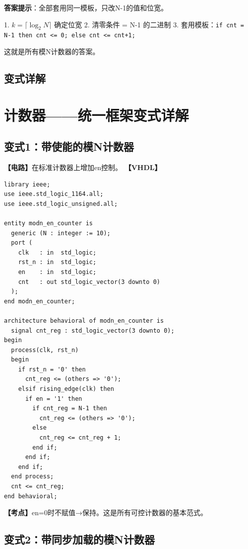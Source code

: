 \textbf{答案提示}：全部套用同一模板，只改N-1的值和位宽。

\begin{examtip}[模N计数器秒杀法]
1. $k = \lceil \log_2 N \rceil$ 确定位宽
2. 清零条件 = N-1 的二进制
3. 套用模板：\texttt{if cnt = N-1 then cnt <= 0; else cnt <= cnt+1;}

这就是所有模N计数器的答案。
\end{examtip}

\section{变式详解}
\chapter{计数器——统一框架变式详解}

\section{变式1：带使能的模N计数器}

\begin{detailbox}[完整教学]
\textbf{【电路】}在标准计数器上增加en控制。
\textbf{【VHDL】}
\begin{lstlisting}
library ieee;
use ieee.std_logic_1164.all;
use ieee.std_logic_unsigned.all;

entity modn_en_counter is
  generic (N : integer := 10);
  port (
    clk   : in  std_logic;
    rst_n : in  std_logic;
    en    : in  std_logic;
    cnt   : out std_logic_vector(3 downto 0)
  );
end modn_en_counter;

architecture behavioral of modn_en_counter is
  signal cnt_reg : std_logic_vector(3 downto 0);
begin
  process(clk, rst_n)
  begin
    if rst_n = '0' then
      cnt_reg <= (others => '0');
    elsif rising_edge(clk) then
      if en = '1' then
        if cnt_reg = N-1 then
          cnt_reg <= (others => '0');
        else
          cnt_reg <= cnt_reg + 1;
        end if;
      end if;
    end if;
  end process;
  cnt <= cnt_reg;
end behavioral;
\end{lstlisting}
\textbf{【考点】}en=0时不赋值→保持。这是所有可控计数器的基本范式。
\end{detailbox}


\section{变式2：带同步加载的模N计数器}

